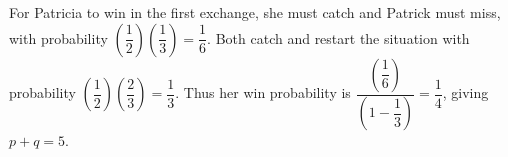 For Patricia to win in the first exchange, she must catch and Patrick must miss, with probability $(\dfrac{1}{2})(\dfrac{1}{3})=\dfrac{1}{6}$. Both catch and restart the situation with probability $(\dfrac{1}{2})(\dfrac{2}{3})=\dfrac{1}{3}$. Thus her win probability is $\dfrac{(\dfrac{1}{6})}{(1-\dfrac{1}{3})}=\dfrac{1}{4}$, giving $p+q=\boxed5$.
